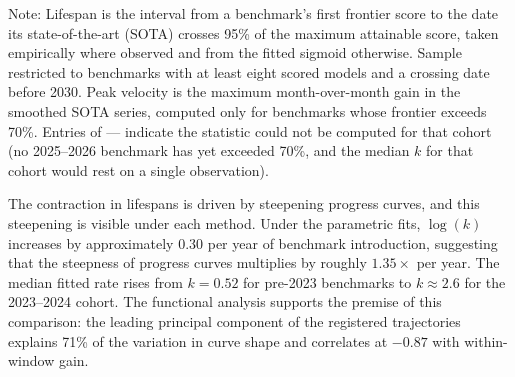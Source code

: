 \begin{table}[t]
\centering
\begin{threeparttable}
\caption{Benchmark saturation dynamics by introduction cohort.}
\label{tab:cohorts}
\begin{tablenotes}
\footnotesize
\item Note: Lifespan is the interval from a benchmark's first frontier score to the date its state-of-the-art (SOTA) crosses 95\% of the maximum attainable score, taken empirically where observed and from the fitted sigmoid otherwise. Sample restricted to benchmarks with at least eight scored models and a crossing date before 2030. Peak velocity is the maximum month-over-month gain in the smoothed SOTA series, computed only for benchmarks whose frontier exceeds 70\%. Entries of --- indicate the statistic could not be computed for that cohort (no 2025--2026 benchmark has yet exceeded 70\%, and the median $k$ for that cohort would rest on a single observation).
\end{tablenotes}
\end{threeparttable}
\end{table}

The contraction in lifespans is driven by steepening progress curves, and this steepening is visible under each method. Under the parametric fits, $\log(k)$ increases by approximately 0.30 per year of benchmark introduction, suggesting that the steepness of progress curves multiplies by roughly $1.35\times$ per year. The median fitted rate rises from $k = 0.52$ for pre-2023 benchmarks to $k \approx 2.6$ for the 2023--2024 cohort. The functional analysis supports the premise of this comparison: the leading principal component of the registered trajectories explains 71\% of the variation in curve shape and correlates at $-0.87$ with within-window gain.

